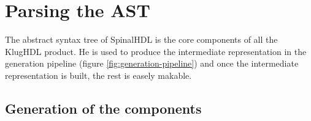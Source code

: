 \chapter{Parsing the AST}
\label{chap:parsing-ast}

The abstract syntax tree of SpinalHDL is the core components of all the KlugHDL
product. He is used to produce the intermediate representation in the generation
pipeline (figure \ref{fig:generation-pipeline}) and once the intermediate
representation is built, the rest is easely makable.

\section{Generation of the components}

